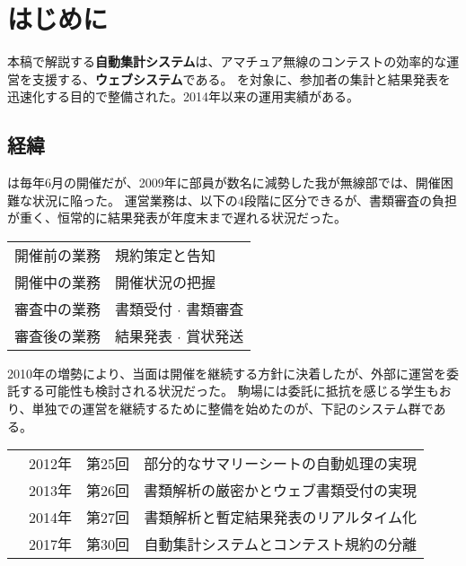 \documentclass[10pt,a4paper]{book}
\begin{document}
\maketitle
\tableofcontents

\chapter{はじめに}

本稿で解説する\textbf{自動集計システム}は、アマチュア無線のコンテストの効率的な運営を支援する、\textbf{ウェブシステム}である。
\ja{}を対象に、参加者の集計と結果発表を迅速化する目的で整備された。2014年以来の運用実績がある。

\section{経緯}

\ja{}は毎年6月の開催だが、2009年に部員が数名に減勢した我が無線部では、開催困難な状況に陥った。
運営業務は、以下の4段階に区分できるが、書類審査の負担が重く、恒常的に結果発表が年度末まで遅れる状況だった。

\begin{table}[H]
\raggedright
\begin{tabular}{Bl}
開催前の業務 & 規約策定と告知 \\
開催中の業務 & 開催状況の把握 \\
審査中の業務 & 書類受付 $\cdot$ 書類審査 \\
審査後の業務 & 結果発表 $\cdot$ 賞状発送 \\
\end{tabular}
\end{table}

2010年の増勢により、当面は開催を継続する方針に決着したが、外部に運営を委託する可能性も検討される状況だった。
駒場には委託に抵抗を感じる学生もおり、単独での運営を継続するために整備を始めたのが、下記のシステム群である。

\begin{table}[H]
\raggedright
\begin{tabular}{lllD}
 & 2012年 & 第25回 & 部分的なサマリーシートの自動処理の実現 \\
 & 2013年 & 第26回 & 書類解析の厳密かとウェブ書類受付の実現 \\
 & 2014年 & 第27回 & 書類解析と暫定結果発表のリアルタイム化 \\
 & 2017年 & 第30回 & 自動集計システムとコンテスト規約の分離 \\
\end{tabular}
\end{table}
\end{document}
